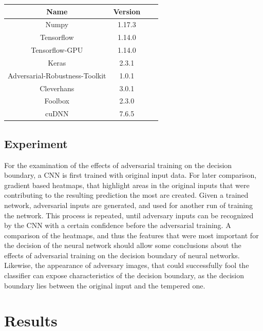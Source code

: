 \documentclass[draft,final]{vutinfth} %
\begin{document}
\begin{table}[h]
  \centering
  \begin{tabular}{cccc}
    \toprule
Name                                    & Version   \\
    \midrule
    Numpy                               & 1.17.3    \\
    Tensorflow                          & 1.14.0    \\
    Tensorflow-GPU                      & 1.14.0    \\
    Keras                               & 2.3.1     \\
    Adversarial-Robustness-Toolkit      & 1.0.1     \\
    Cleverhans                          & 3.0.1     \\
    Foolbox                             & 2.3.0     \\
		cuDNN																&	7.6.5			\\
    
    \bottomrule
  \end{tabular}
\end{table}

\section{Experiment}

For the examination of the effects of adversarial training on the decision boundary, a CNN is first trained with original input data. For later comparison, gradient based heatmaps, that highlight areas in the original inputs
that were contributing to the resulting prediction the most are created. Given a trained network, adversarial inputs are generated, and used for another run of training the network. This process is repeated, until adversary
inputs can be recognized by the CNN with a certain confidence before the adversarial training. 
A comparison of the heatmaps, and thus the features that were most important for the decision of the neural network should allow some conclusions about the effects of adversarial training on the decision boundary of neural networks. Likewise,
the appearance of adversary images, that could successfully fool the classifier can expose characteristics of the decision boundary, as the decision boundary lies between the original input and the tempered one.

\chapter{Results}
\end{document}
